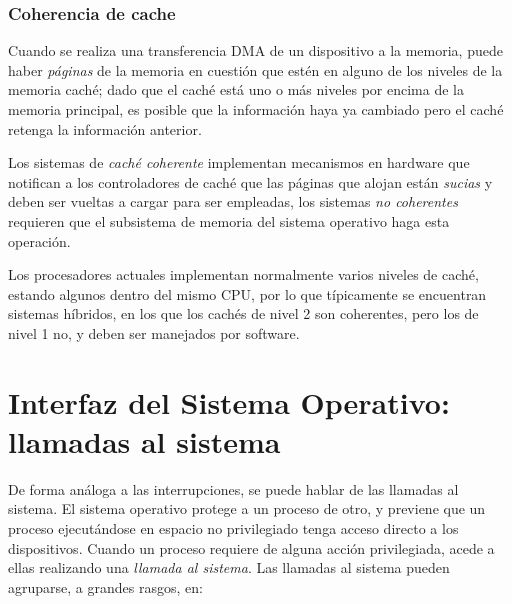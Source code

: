\documentclass[11pt,fleqn]{book} %
\begin{document}
\subsubsection{Coherencia de cache}
\label{sec-2-6-2-1}


Cuando se realiza una transferencia DMA de un dispositivo a la
memoria, puede haber \emph{páginas} de la memoria en cuestión que estén en
alguno de los niveles de la memoria caché; dado que el caché está uno
o más niveles por encima de la memoria principal, es posible que la
información haya ya cambiado pero el caché retenga la información
anterior.

Los sistemas de \emph{caché coherente} implementan mecanismos en hardware
que notifican a los controladores de caché que las páginas que alojan
están \emph{sucias} y deben ser vueltas a cargar para ser empleadas, los
sistemas \emph{no coherentes} requieren que el subsistema de memoria del
sistema operativo haga esta operación.

Los procesadores actuales implementan normalmente varios niveles de
caché, estando algunos dentro del mismo CPU, por lo que típicamente
se encuentran sistemas híbridos, en los que los cachés de nivel 2 son
coherentes, pero los de nivel 1 no, y deben ser manejados por
software.
\section{Interfaz del Sistema Operativo: llamadas al sistema}
\label{sec-2-7}
\label{HW_SYSCALLS}

De forma análoga a las interrupciones, se puede hablar
de las llamadas al sistema. El sistema operativo protege a un proceso
de otro, y previene que un proceso ejecutándose en espacio no
privilegiado tenga acceso directo a los dispositivos. Cuando un
proceso requiere de alguna acción privilegiada, acede a ellas realizando 
una \emph{llamada al sistema}. Las llamadas al sistema pueden agruparse, a
grandes rasgos, en:
\end{document}
